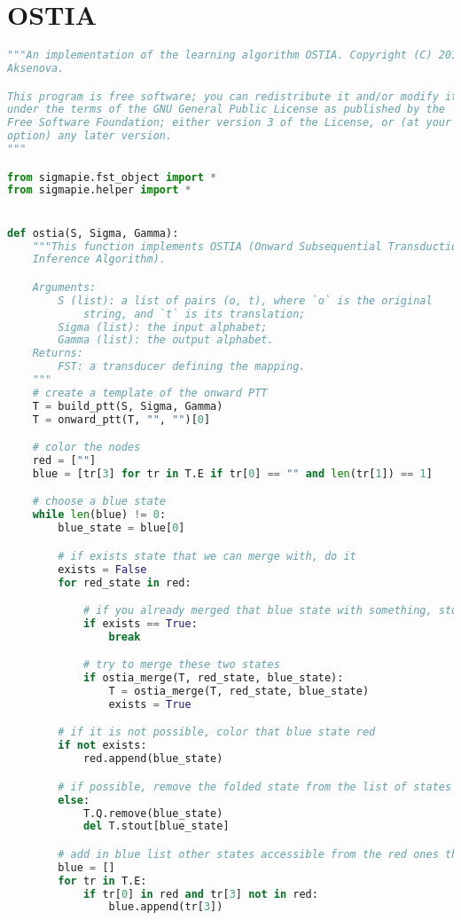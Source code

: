 \section{OSTIA}

\begin{lstlisting}[language=Python]
"""An implementation of the learning algorithm OSTIA. Copyright (C) 2019  Alena
Aksenova.

This program is free software; you can redistribute it and/or modify it
under the terms of the GNU General Public License as published by the
Free Software Foundation; either version 3 of the License, or (at your
option) any later version.
"""

from sigmapie.fst_object import *
from sigmapie.helper import *


def ostia(S, Sigma, Gamma):
    """This function implements OSTIA (Onward Subsequential Transduction
    Inference Algorithm).

    Arguments:
        S (list): a list of pairs (o, t), where `o` is the original
            string, and `t` is its translation;
        Sigma (list): the input alphabet;
        Gamma (list): the output alphabet.
    Returns:
        FST: a transducer defining the mapping.
    """
    # create a template of the onward PTT
    T = build_ptt(S, Sigma, Gamma)
    T = onward_ptt(T, "", "")[0]

    # color the nodes
    red = [""]
    blue = [tr[3] for tr in T.E if tr[0] == "" and len(tr[1]) == 1]

    # choose a blue state
    while len(blue) != 0:
        blue_state = blue[0]

        # if exists state that we can merge with, do it
        exists = False
        for red_state in red:

            # if you already merged that blue state with something, stop
            if exists == True:
                break

            # try to merge these two states
            if ostia_merge(T, red_state, blue_state):
                T = ostia_merge(T, red_state, blue_state)
                exists = True

        # if it is not possible, color that blue state red
        if not exists:
            red.append(blue_state)

        # if possible, remove the folded state from the list of states
        else:
            T.Q.remove(blue_state)
            del T.stout[blue_state]

        # add in blue list other states accessible from the red ones that are not red
        blue = []
        for tr in T.E:
            if tr[0] in red and tr[3] not in red:
                blue.append(tr[3])


\end{lstlisting}
